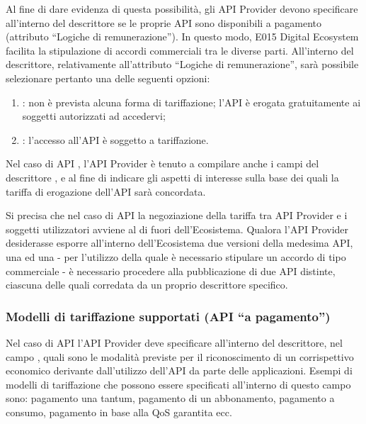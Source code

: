 \documentclass[letterpaper,10pt,italian]{sphinxmanual}
\begin{document}
Al fine di dare evidenza di questa possibilità, gli API Provider devono specificare all’interno del descrittore se le proprie API sono disponibili a pagamento (attributo “Logiche di remunerazione”). In questo modo, E015 Digital Ecosystem facilita la stipulazione di accordi commerciali tra le diverse parti.
All’interno del descrittore, relativamente all’attributo “Logiche di remunerazione”, sarà possibile selezionare pertanto una delle seguenti opzioni:
\begin{enumerate}
\item {} 
: non è prevista alcuna forma di tariffazione; l’API è erogata gratuitamente ai soggetti autorizzati ad accedervi;

\item {} 
: l’accesso all’API è soggetto a tariffazione.

\end{enumerate}

Nel caso di API , l’API Provider è tenuto a compilare anche i campi del descrittore ,  e  al fine di indicare gli aspetti di interesse sulla base dei quali la tariffa di erogazione dell’API sarà concordata.

Si precisa che nel caso di API  la negoziazione della tariffa tra API Provider e i soggetti utilizzatori avviene al di fuori dell’Ecosistema.
Qualora l’API Provider desiderasse esporre all’interno dell’Ecosistema due versioni della medesima API, una  ed una  - per l’utilizzo della quale è necessario stipulare un accordo di tipo commerciale - è necessario procedere alla pubblicazione di due API distinte, ciascuna delle quali corredata da un proprio descrittore specifico.


\subsubsection{Modelli di tariffazione supportati (API “a pagamento”)}
\label{\detokenize{sez25:sezione2531}}\label{\detokenize{sez25:modelli-di-tariffazione-supportati-api-a-pagamento}}
Nel caso di API  l’API Provider deve specificare all’interno del descrittore, nel campo , quali sono le modalità previste per il riconoscimento di un corrispettivo economico derivante dall’utilizzo dell’API da parte delle applicazioni.
Esempi di modelli di tariffazione che possono essere specificati all’interno di questo campo sono: pagamento una tantum, pagamento di un abbonamento, pagamento a consumo, pagamento in base alla QoS garantita ecc.
\end{document}
